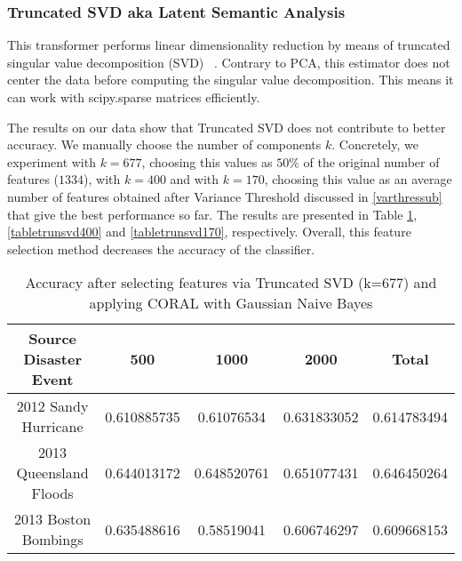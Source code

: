 \subsubsection{Truncated SVD aka Latent Semantic Analysis}

This transformer performs linear dimensionality reduction by means of truncated singular value decomposition (SVD) ~\citep{ir}. Contrary to PCA, this estimator does not center the data before computing the singular value decomposition. This means it can work with scipy.sparse matrices efficiently. 

The results on our data show that Truncated SVD does not contribute to better accuracy. We manually choose the number of components $k$. Concretely, we experiment with $k=677$, choosing this values as $50\%$ of the original number of features ($1334$), with $k=400$ and with $k=170$, choosing this value as an average number of features obtained after Variance Threshold discussed in \ref{varthressub} that give the best performance so far. The results are presented in Table \ref{tabletrunsvd677}, \ref{tabletrunsvd400} and \ref{tabletrunsvd170}, respectively. Overall, this feature selection method decreases the accuracy of the classifier. 

\begin{table}[!h]%
    \begin{center}
    \caption{Accuracy after selecting features via Truncated SVD (k=677) and applying CORAL with Gaussian Naive Bayes}
    \begin{tabular}[c]{|c|c|c|c|c|}
        \hline
        Source Disaster Event & 500 & 1000 & 2000 & Total \\
        \hline
        2012 Sandy Hurricane & 0.610885735 & 0.61076534 & 0.631833052 & 0.614783494 \\
        2013 Queensland Floods & 0.644013172 & 0.648520761 & 0.651077431 & 0.646450264 \\
        2013 Boston Bombings & 0.635488616 & 0.58519041 & 0.606746297 & 0.609668153 \\
        \hline
    \end{tabular}
    \label{tabletrunsvd677}
   \end{center}
\end{table}

